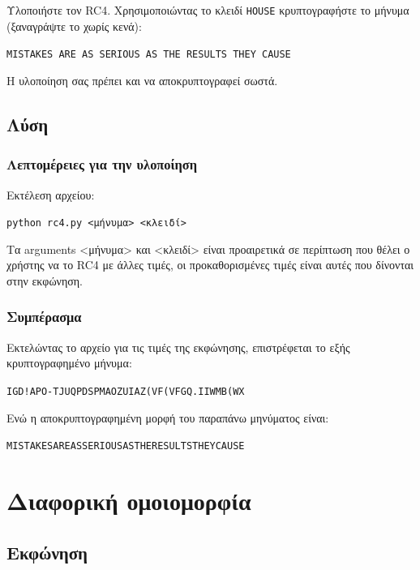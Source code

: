 \documentclass[oneside]{article}
\let\t\texttt
\begin{document}
Υλοποιήστε τον RC4. Χρησιμοποιώντας το κλειδί \t{HOUSE} κρυπτογραφήστε το μήνυμα (ξαναγράψτε το χωρίς κενά):
\begin{center}
    \t{MISTAKES ARE AS SERIOUS AS THE RESULTS THEY CAUSE}
\end{center}

Η υλοποίηση σας πρέπει και να αποκρυπτογραφεί σωστά.

\subsection{Λύση} 

\subsubsection{Λεπτομέρειες για την υλοποίηση}

Εκτέλεση αρχείου:

\begin{center}
    \t{python rc4.py <μήνυμα> <κλειδί>}
\end{center}

Τα arguments <μήνυμα> και <κλειδί> είναι προαιρετικά σε περίπτωση που θέλει ο χρήστης να το RC4 με άλλες τιμές, οι προκαθορισμένες τιμές είναι αυτές που δίνονται στην εκφώνηση.

\subsubsection{Συμπέρασμα}

Εκτελώντας το αρχείο για τις τιμές της εκφώνησης, επιστρέφεται το εξής κρυπτογραφημένο μήνυμα: 

\begin{center}
    \t{IGD!APO-TJUQPDSPMAOZUIAZ(VF(VFGQ.IIWMB(WX}
\end{center}

Ενώ η αποκρυπτογραφημένη μορφή του παραπάνω μηνύματος είναι: 

\begin{center}
    \t{MISTAKESAREASSERIOUSASTHERESULTSTHEYCAUSE}
\end{center}

\section{Διαφορική ομοιομορφία}

\subsection{Εκφώνηση}
\end{document}
